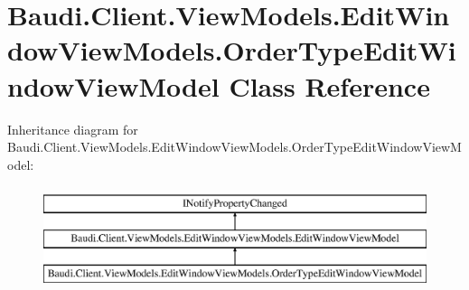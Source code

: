 \hypertarget{class_baudi_1_1_client_1_1_view_models_1_1_edit_window_view_models_1_1_order_type_edit_window_view_model}{}\section{Baudi.\+Client.\+View\+Models.\+Edit\+Window\+View\+Models.\+Order\+Type\+Edit\+Window\+View\+Model Class Reference}
\label{class_baudi_1_1_client_1_1_view_models_1_1_edit_window_view_models_1_1_order_type_edit_window_view_model}
Inheritance diagram for Baudi.\+Client.\+View\+Models.\+Edit\+Window\+View\+Models.\+Order\+Type\+Edit\+Window\+View\+Model\+:\begin{figure}[H]
\begin{center}
\leavevmode
\includegraphics[height=3.000000cm]{class_baudi_1_1_client_1_1_view_models_1_1_edit_window_view_models_1_1_order_type_edit_window_view_model}
\end{center}
\end{figure}
